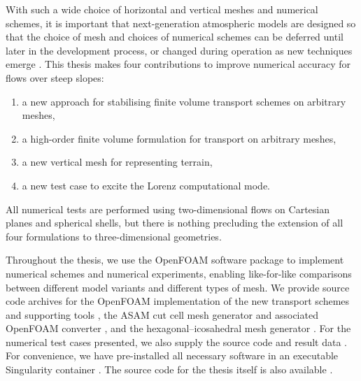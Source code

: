 With such a wide choice of horizontal and vertical meshes and numerical schemes, it is important that next-generation atmospheric models are designed so that the choice of mesh and choices of numerical schemes can be deferred until later in the development process, or changed during operation as new techniques emerge \citep{ford2013, theurich2016}.
This thesis makes four contributions to improve numerical accuracy for flows over steep slopes:
\begin{enumerate}
\item a new approach for stabilising finite volume transport schemes on arbitrary meshes,
\item a high-order finite volume formulation for transport on arbitrary meshes,
\item a new vertical mesh for representing terrain,
\item a new test case to excite the Lorenz computational mode.
\end{enumerate}
All numerical tests are performed using two-dimensional flows on Cartesian planes and spherical shells, but there is nothing precluding the extension of all four formulations to three-dimensional geometries.

Throughout the thesis, we use the OpenFOAM software package  to implement numerical schemes and numerical experiments, enabling like-for-like comparisons between different model variants and different types of mesh.
We provide source code archives for the OpenFOAM implementation of the new transport schemes \citep{atmosfoam,highOrderFit} and supporting tools \citep{atmosfoam-tools,ninjaopenfoam}, the ASAM cut cell mesh generator \citep{asam_grid} and associated OpenFOAM converter \citep{gmv2openfoam}, and the hexagonal–icosahedral mesh generator \citep{geodesic-mesh}.
For the numerical test cases presented, we also supply the source code \citep{atmostests} and result data \citep{atmostests-results}.
For convenience, we have pre-installed all necessary software in an executable Singularity container \citep{atmostests-singularity}.
The source code for the thesis itself is also available \citep{thesis}.

